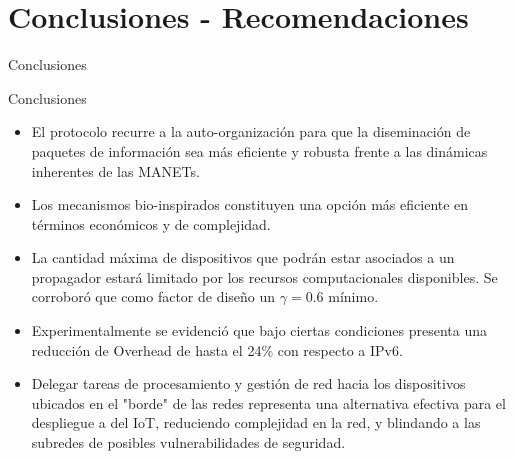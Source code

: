 \section{Conclusiones - Recomendaciones}
\begin{frame}{Conclusiones}
  \begin{block}{Conclusiones}
   \begin{itemize}
   \justifying
    \item<1->  El protocolo recurre a la auto-organización para que la diseminación de paquetes de información sea más eficiente y robusta frente a las dinámicas inherentes de las MANETs.
    \item<1->  Los mecanismos bio-inspirados constituyen una opción más eficiente en términos económicos y de complejidad.
    \item<1-> La cantidad máxima de dispositivos que podrán estar asociados a un propagador estará limitado por los recursos computacionales disponibles. Se corroboró que como factor de diseño un $\gamma =0.6$ mínimo.\\
    \item<1->  Experimentalmente se evidenció que bajo ciertas condiciones presenta una reducción de Overhead de hasta el 24\% con respecto a IPv6.\\
    \item<1->  Delegar tareas de procesamiento y gestión de red hacia los dispositivos ubicados en el "borde" de las redes representa una alternativa efectiva para el despliegue a del IoT, reduciendo complejidad en la red, y blindando a las subredes de posibles vulnerabilidades de seguridad.
    \end{itemize}
  \end{block}
\end{frame}
